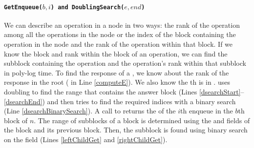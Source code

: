\paragraph{\tt{GetEnqueue($b,i$)} and \tt{DoublingSearch($e, end$)}}
We can describe an operation in a node in two ways: the rank of the
operation among all the operations in the node or the index of the
block containing the operation in the node and the rank of the
operation within that block. If we know the block and rank within the
block of an operation, we can find the subblock containing the
operation and the operation's rank within that subblock in poly-log
time. To find the response of a , we know about the  rank
of the response  in the root ( in Line
\ref{computeE}). 
We also know the th  is in
.  uses doubling to find
the range that contains the answer block (Lines
\ref{dsearchStart}--\ref{dsearchEnd}) and then tries to find the
required indices with a binary search (Line
\ref{dsearchBinarySearch}). 
A call to  returns the  of the
$i$th enqueue in the $b$th block of $n$. The range of subblocks of a
block is determined using the  and
 fields of the block and its previous block. Then,
the subblock is found using binary search on the 
field (Lines \ref{leftChildGet} and \ref{rightChildGet}). 

